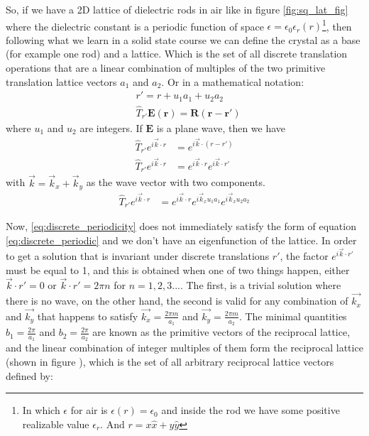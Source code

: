 So, if we have a 2D lattice of dielectric rods in air like in figure \ref{fig:sq_lat_fig} where the dielectric constant is a periodic function of space $\epsilon = \epsilon_0\epsilon_r(r)$\footnote{In which $\epsilon$ for air is $\epsilon(r) = \epsilon_0$ and inside the rod we have some positive realizable value $\epsilon_r$. And $r= x\hat{x}+y\hat{y}$}, then following what we learn in a solid state course we can define the crystal as a base (for example one rod) and a lattice. Which is the set of all discrete translation operations that are a linear combination of  multiples of the two primitive translation lattice vectors $a_1$ and $a_2$\cite{Kittel2005}. Or in a mathematical notation:
\begin{align}
&r' = r+u_1a_1+u_2a_2\\
& \hat{T}_{r'}\mathbf{E(r)} = \mathbf{R(r-r')} 
\label{eq:discrete_periodic}
\end{align}
where $u_1$ and $u_2$ are integers. If $\mathbf{E}$ is a plane wave, then we have 
\begin{align*}
\hat{T}_{r'}e^{i\vec{k}\cdot r} &= e^{i\vec{k}\cdot (r-r')}\\
\hat{T}_{r'}e^{i\vec{k}\cdot r} &= e^{i\vec{k}\cdot r} e^{i\vec{k}\cdot r'}
\end{align*}
with $\vec{k} = \vec{k}_x+\vec{k}_y$ as the wave vector with two components.
\begin{align}
\hat{T}_{r'}e^{i\vec{k}\cdot r} &= e^{i\vec{k}\cdot r} e^{i\vec{k}_x u_1a_1}e^{i\vec{k}_x u_2a_2}\label{eq:discrete_periodicity}
\end{align}

Now, \ref{eq:discrete_periodicity} does not immediately satisfy the form of equation \ref{eq:discrete_periodic} and we don't have an eigenfunction of the lattice. In order to get a solution that is invariant under discrete translations $r'$, the factor $e^{i\vec{k}\cdot r'}$ must be equal to 1, and this is obtained when one of two things happen, either $\vec{k}\cdot r' = 0$ or $\vec{k}\cdot r' = 2\pi n$ for $n = 1,2,3...$.
The first, is a trivial solution where there is no wave, on the other hand, the second is valid for any combination of $\vec{k_x}$ and $\vec{k_y}$ that happens to satisfy $\vec{k_x} = \frac{2\pi m}{a_1}$ and $\vec{k_y} = \frac{2\pi m}{a_2}$.  The minimal quantities $b_1 = \frac{2\pi}{a_1}$ and $b_2 = \frac{2\pi}{a_2}$ are known as the primitive vectors of the reciprocal lattice, and the linear combination of integer multiples of them form the reciprocal lattice (shown in figure ), which is the set of all arbitrary reciprocal lattice vectors defined by:

